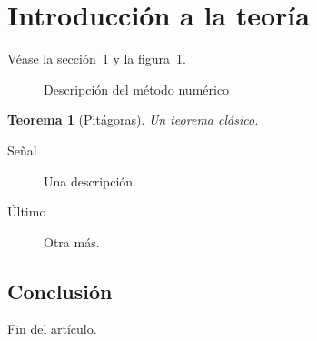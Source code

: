 \documentclass{article}
\newtheorem{teo}{Teorema}
\begin{document}
\tableofcontents
\section{Introducción a la teoría}\label{s}
Véase la sección~\ref{s} y la figura~\ref{f}.
\begin{figure}[h]
\caption{Descripción del método numérico}\label{f}
\end{figure}
\begin{teo}[Pitágoras]
Un teorema clásico.
\end{teo}
\begin{description}
\item[Señal] Una descripción.
\item[Último] Otra más.
\end{description}
\subsection{Conclusión}
Fin del artículo.
\end{document}
